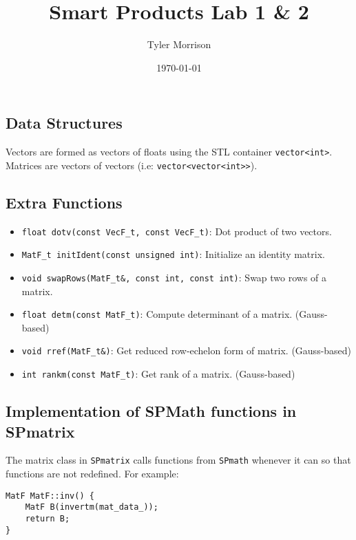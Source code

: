 \documentclass{article}
\title{Smart Products Lab 1 \& 2}
\author{Tyler Morrison}
\date\today
\begin{document}
\maketitle
\section{}
\subsection{Data Structures}
Vectors are formed as vectors of floats using the STL container \texttt{vector<int>}. Matrices are vectors of vectors (i.e: \texttt{vector<vector<int>>}).

\subsection{Extra Functions}

\begin{itemize}
	\item \texttt{float dotv(const VecF_t, const VecF_t)}: Dot product of two vectors.
	\item \texttt{MatF_t initIdent(const unsigned int)}: Initialize an identity matrix.
	\item \texttt{void swapRows(MatF_t\&, const int, const int)}: Swap two rows of a matrix.
	\item \texttt{float detm(const MatF_t)}: Compute determinant of a matrix. (Gauss-based)
	\item \texttt{void rref(MatF_t\&)}: Get reduced row-echelon form of matrix. (Gauss-based)
	\item \texttt{int rankm(const MatF_t)}: Get rank of a matrix. (Gauss-based)
\end{itemize}

\subsection{Implementation of SPMath functions in SPmatrix}
The matrix class in \texttt{SPmatrix} calls functions from \texttt{SPmath} whenever it can so that functions are not redefined. For example:


\begin{lstlisting}
MatF MatF::inv() {
	MatF B(invertm(mat_data_));
	return B;
}
\end{lstlisting}

\section{}
\end{document}
